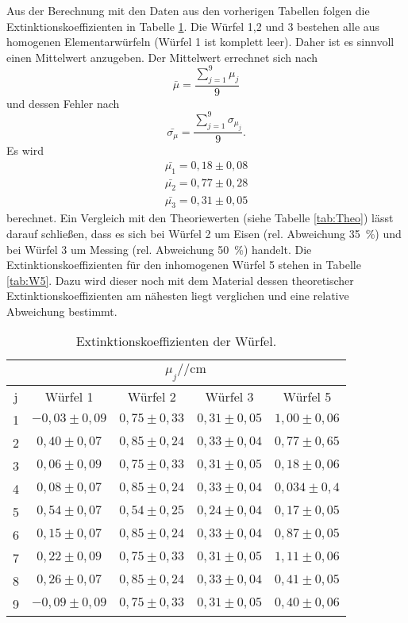 \FloatBarrier
Aus der Berechnung mit den Daten aus den vorherigen Tabellen folgen die Extinktionskoeffizienten in Tabelle \ref{tab:Ex}.
Die Würfel 1,2 und 3 bestehen alle aus homogenen Elementarwürfeln (Würfel 1 ist komplett leer).
Daher ist es sinnvoll einen Mittelwert anzugeben. 
Der Mittelwert errechnet sich nach 
\begin{equation*}
    \bar{\mu}=\frac{\sum_{j=1}^9\mu_j}{9}
\end{equation*}
und dessen Fehler nach 
\begin{equation*}
    \bar{\sigma_\mu}=\frac{\sum_{j=1}^9\sigma_{\mu_j}}{9}.
\end{equation*}
Es wird 
\begin{align*}
    \bar{\mu_1}=0,18\pm0,08\\
    \bar{\mu_2}=0,77\pm0,28\\
    \bar{\mu_3}=0,31\pm0,05
\end{align*}
berechnet.
Ein Vergleich mit den Theoriewerten (siehe Tabelle \ref{tab:Theo}) lässt darauf schließen, dass es sich bei Würfel 2 um Eisen (rel. Abweichung \SI{35}{\percent}) und bei Würfel 3 um Messing (rel. Abweichung \SI{50}{\percent}) handelt.
Die Extinktionskoeffizienten für den inhomogenen Würfel 5 stehen in Tabelle \ref{tab:W5}.
Dazu wird dieser noch mit dem Material dessen theoretischer Extinktionskoeffizienten am nähesten liegt verglichen und eine relative Abweichung bestimmt.

\begin{table}[H]
    \centering
    \begin{tabular}{|c|c|c|c|c|}  
    \cline{2-5}
    \multicolumn{1}{c|}{} & \multicolumn{4}{c|}{$\mu_j/\si{\per\centi\meter}$} \tabularnewline
    \hline
    \multicolumn{1}{|c|}{j} &\multicolumn{1}{c|}{Würfel 1} & \multicolumn{1}{c|}{Würfel 2} & \multicolumn{1}{c|}{Würfel 3} & \multicolumn{1}{c|}{Würfel 5}\tabularnewline
    \hline
    1 & $-0,03\pm0,09$ & $0,75\pm0,33$ & $0,31\pm0,05$& $1,00\pm0,06$\tabularnewline
    \hline
    2 & $0,40\pm0,07$& $0,85\pm0,24$ & $0,33\pm0,04$ & $0,77\pm0,65$\tabularnewline
    \hline
    3 & $0,06\pm0,09$ & $0,75\pm0,33$ & $0,31\pm0,05$ & $0,18\pm0,06$\tabularnewline
    \hline
    4 & $0,08\pm0,07$ & $0,85\pm0,24$ & $0,33\pm0,04$ & $0,034\pm0,4$\tabularnewline
    \hline
    5 & $0,54\pm0,07$ & $0,54\pm0,25$ & $0,24\pm0,04$ & $0,17\pm0,05$\tabularnewline
    \hline
    6 & $0,15\pm0,07$ & $0,85\pm0,24$ & $0,33\pm0,04$ & $0,87\pm0,05$\tabularnewline
    \hline
    7 & $0,22\pm0,09$ & $0,75\pm0,33$ & $0,31\pm0,05$ & $1,11\pm0,06$\tabularnewline
    \hline
    8 & $0,26\pm0,07$ & $0,85\pm0,24$ & $0,33\pm0,04$ & $0,41\pm0,05$\tabularnewline
    \hline
    9 & $-0,09\pm0,09$ & $0,75\pm0,33$ & $0,31\pm0,05$ & $0,40\pm0,06$\tabularnewline
    \hline
    \end{tabular}
    
    \caption{Extinktionskoeffizienten der Würfel.}
    \label{tab:Ex}
    \end{table}
\FloatBarrier



